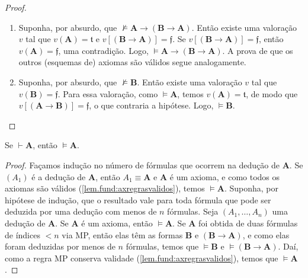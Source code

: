 \begin{proof}
    \leavevmode
        \begin{enumerate}[leftmargin=*, align=left, label=\textbf{(\alph*)}]
            \item Suponha, por absurdo, que $\not\vDash\mathbf{A} \rightarrow (\mathbf{B} \rightarrow \mathbf{A})$. Então existe uma valoração $v$ tal que $v(\mathbf{A}) = \mathfrak{t}$ e $v[(\mathbf{B} \rightarrow \mathbf{A})] = \mathfrak{f}$. Se $v[(\mathbf{B} \rightarrow \mathbf{A})] = \mathfrak{f}$, então $v(\mathbf{A}) = \mathfrak{f}$, uma contradição. Logo, $\vDash\mathbf{A} \rightarrow (\mathbf{B} \rightarrow \mathbf{A})$. A prova de que os outros (esquemas de) axiomas são válidos segue analogamente. \blackproof
            \item Suponha, por absurdo, que $\not\vDash \mathbf{B}$. Então existe uma valoração $v$ tal que $v(\mathbf{B}) = \mathfrak{f}$. Para essa valoração, como $\vDash \mathbf{A}$, temos $v(\mathbf{A}) = \mathfrak{t}$, de modo que $v[(\mathbf{A} \rightarrow \mathbf{B})] = \mathfrak{f}$, o que contraria a hipótese. Logo, $\vDash \mathbf{B}$. \blackproof
        \end{enumerate}
\end{proof}


\begin{theorem}[da Correção] \label{teo.fund:correçãoproposicional}
    Se $\vdash \mathbf{A}$, então $\vDash \mathbf{A}$.
\end{theorem}

\begin{proof}
    Façamos indução no número de fórmulas que ocorrem na dedução de $\mathbf{A}$. Se $(A_1)$ é a dedução de $\mathbf{A}$, então $A_1 \equiv \mathbf{A}$ e $\mathbf{A}$ é um axioma, e como todos os axiomas são válidos (\cref{lem.fund:axregrasvalidos}), temos $\vDash \mathbf{A}$. Suponha, por hipótese de indução, que o resultado vale para toda fórmula que pode ser deduzida por uma dedução com menos de $n$ fórmulas. Seja $(A_1, \ldots, A_n)$ uma dedução de $\mathbf{A}$. Se $\mathbf{A}$ é um axioma, então $\vDash \mathbf{A}$. Se $\mathbf{A}$ foi obtida de duas fórmulas de índices $<n$ via MP, então elas têm as formas $\mathbf{B}$ e $(\mathbf{B} \rightarrow \mathbf{A})$, e como elas foram deduzidas por menos de $n$ fórmulas, temos que $\vDash \mathbf{B}$ e $\vDash (\mathbf{B} \rightarrow \mathbf{A})$. Daí, como a regra MP conserva validade (\cref{lem.fund:axregrasvalidos}), temos que $\vDash \mathbf{A}$. \blackproof
\end{proof}

